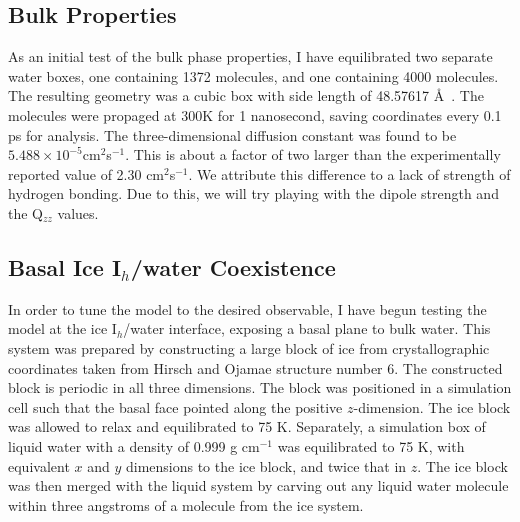 \subsection{Bulk Properties}
As an initial test of the bulk phase properties, I have equilibrated two
separate water boxes, one containing 1372 molecules, and one
containing 4000 molecules. The resulting geometry was a cubic
box with side length of 48.57617 \AA~. The molecules were propaged at 300K for
1 nanosecond, saving coordinates every 0.1 ps for analysis. The 
three-dimensional diffusion constant was found to be 
$5.488\times10^{-5}$cm$^{2}$s$^{-1}$. This is about a factor of two larger
than the experimentally reported value of 2.30 cm$^{2}$s$^{-1}$. We attribute
this difference to a lack of strength of hydrogen bonding. Due to this,
we will try playing with the dipole strength and the Q$_{zz}$ values.
		

\subsection{Basal Ice I$_{h}$/water Coexistence}
In order to tune the model to the desired observable, I have begun testing 
the model at the ice I$_{h}$/water interface, exposing a basal plane to bulk 
water. This system was prepared by constructing a large block of ice from 
crystallographic coordinates taken from Hirsch and Ojamae structure number
6\cite{Hirsch2004}. The constructed block is periodic in all three dimensions. 
The block was positioned in a simulation cell such that the basal face pointed
along the positive $z$-dimension. The ice block was allowed to relax and 
equilibrated to 75 K. Separately, a simulation box of liquid water with a 
density of 0.999 g cm$^{-1}$ was 
equilibrated to 75 K, with equivalent $x$ and $y$ dimensions to the ice block,
and twice that in $z$. The ice block was then merged with the liquid system
by carving out any liquid water molecule within three angstroms of a molecule
from the ice system.
	
	

		